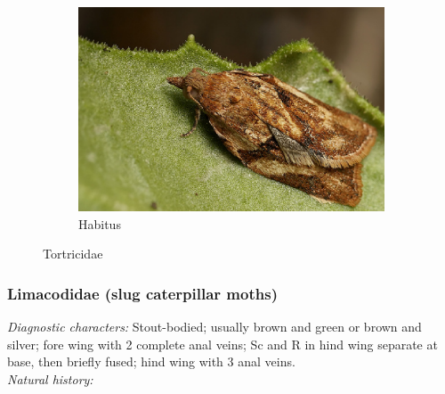 \documentclass[letterpaper, 11pt]{article}
\begin{document}
\begin{figure}[ht!]
\begin{subfigure}[ht!]{0.48\textwidth}
        \includegraphics[width=\textwidth]{image45}
        \caption{Habitus}
        \label{fig:tortricid2}
    \end{subfigure}
    \caption{Tortricidae}\label{fig:tortricids}
\end{figure}

\subsubsection{Limacodidae (slug caterpillar moths)}
\noindent{}\textit{Diagnostic characters:} Stout-bodied; usually brown and green or brown and silver; fore wing with 2 complete anal veins; Sc and R in hind wing separate at base, then briefly fused; hind wing with 3 anal veins.\\

\noindent{}\textit{Natural history:} 
\end{document}

